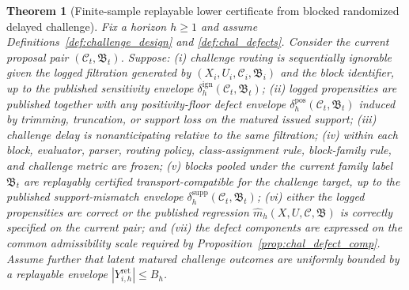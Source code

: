 \documentclass[11pt]{article}
\newtheorem{theorem}{Theorem}[section]
\theoremstyle{definition}
\newcommand{\1}{\mathbf{1}}
\begin{document}
\begin{theorem}[Finite-sample replayable lower certificate from blocked randomized delayed challenge]\label{thm:dr_shadow_cert}
Fix a horizon $h\ge1$ and assume Definitions~\ref{def:challenge_design} and \ref{def:chal_defects}. Consider the current proposal pair $(\mathcal C_t,\mathfrak B_t)$. Suppose: (i) challenge routing is sequentially ignorable given the logged filtration generated by $(X_i,U_i,\mathcal C_i,\mathfrak B_i)$ and the block identifier, up to the published sensitivity envelope $\delta_h^{\mathrm{ign}}(\mathcal C_t,\mathfrak B_t)$; (ii) logged propensities are published together with any positivity-floor defect envelope $\delta_h^{\mathrm{pos}}(\mathcal C_t,\mathfrak B_t)$ induced by trimming, truncation, or support loss on the matured issued support; (iii) challenge delay is nonanticipating relative to the same filtration; (iv) within each block, evaluator, parser, routing policy, class-assignment rule, block-family rule, and challenge metric are frozen; (v) blocks pooled under the current family label $\mathfrak B_t$ are replayably certified transport-compatible for the challenge target, up to the published support-mismatch envelope $\delta_h^{\mathrm{supp}}(\mathcal C_t,\mathfrak B_t)$; (vi) either the logged propensities are correct or the published regression $\widehat m_h(X,U,\mathcal C,\mathfrak B)$ is correctly specified on the current pair; and (vii) the defect components are expressed on the common admissibility scale required by Proposition~\ref{prop:chal_defect_comp}. Assume further that latent matured challenge outcomes are uniformly bounded by a replayable envelope $|Y_{i,h}^{\mathrm{ret}}|\le B_h$.


\end{theorem}
\end{document}
